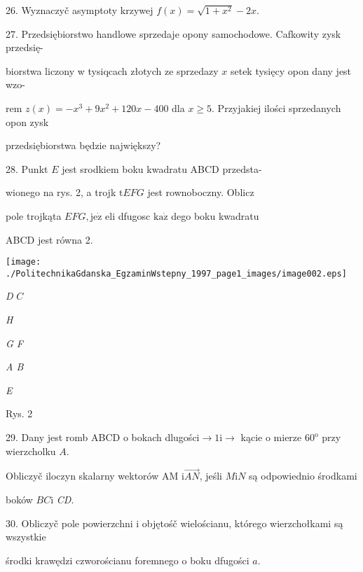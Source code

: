 \documentclass[a4paper,12pt]{article}
\begin{document}
26. Wyznaczyč asymptoty krzywej $f(x)=\sqrt{1+x^{2}}-2x.$

27. Przedsiębiorstwo handlowe sprzedaje opony samochodowe. Cafkowity zysk przedsię-

biorstwa liczony w tysiqcach złotych ze sprzedazy $x$ setek tysięcy opon dany jest wzo-

rem $z(x)=-x^{3}+9x^{2}+120x-400$ dla $x\geq 5$. Przyjakiej ilości sprzedanych opon zysk

przedsiębiorstwa będzie największy?

28. Punkt $E$ jest srodkiem boku kwadratu ABCD przedsta-

wionego na rys. 2, a trojk $\mathrm{t}EFG$ jest rownoboczny. Oblicz

pole trojkąta $EFG, \mathrm{j}\mathrm{e}\dot{\mathrm{z}}$ eli dfugosc $\mathrm{k}\mathrm{a}\dot{\mathrm{z}}$ dego boku kwadratu

ABCD jest równa 2.
\begin{center}
\texttt{[image: ./PolitechnikaGdanska\_EgzaminWstepny\_1997\_page1\_images/image002.eps]}
\end{center}
{\it D} $C$

{\it H}

{\it G F}

{\it A B}

{\it E}

Rys. 2

29. Dany jest romb ABCD o bokach dlugości$\rightarrow  1\mathrm{i}\rightarrow$ kącie o mierze $60^{\mathrm{o}}$ przy wierzcholku $A.$

Obliczyč iloczyn skalarny wektorów AM $\mathrm{i}\vec{AN}$, jeśli $M\mathrm{i}N$ są odpowiednio środkami

boków $BC\mathrm{i}$ {\it CD}.

30. Obliczyč pole powierzchni i objętośč wielościanu, którego wierzchołkami są wszystkie

środki krawędzi czworościanu foremnego o boku dfugości $a.$
\end{document}
